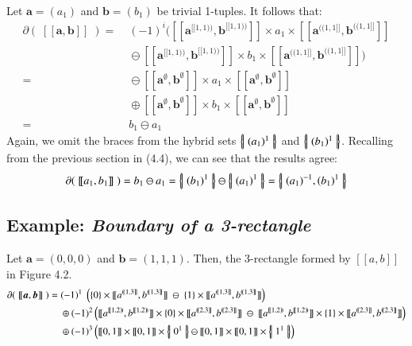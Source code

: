 Let $\boldsymbol{a}= (a_1)$ and $\boldsymbol{b} = (b_1)$ be trivial 1-tuples. 
It follows that:
\begin{align*}
	\partial ( \; [\![ \boldsymbol{a}, \boldsymbol{b} ]\!] \; )
	=& \; (-1)^i ( [\![\boldsymbol{a}^{[\![1,1)\!)}, \boldsymbol{b}^{[\![1,1)\!)} ]\!]
	\times a_1 \times
	[\![\boldsymbol{a}^{(\!(1,1]\!]}, \boldsymbol{b}^{(\!(1,1]\!]} ]\!]\\
	&\; \ominus
	[\![\boldsymbol{a}^{[\![1,1)\!)}, \boldsymbol{b}^{[\![1,1)\!)} ]\!]
	\times b_1 \times
	[\![\boldsymbol{a}^{(\!(1,1]\!]}, \boldsymbol{b}^{(\!(1,1]\!]} ]\!] )\\
	=& \; \ominus [\![\boldsymbol{a}^{\emptyset}, \boldsymbol{b}^{\emptyset} ]\!]
	\times a_1 \times
	[\![\boldsymbol{a}^{\emptyset}, \boldsymbol{b}^{\emptyset} ]\!]\\
	& \; \oplus
	[\![\boldsymbol{a}^{\emptyset}, \boldsymbol{b}^{\emptyset} ]\!]
	\times b_1 \times
	[\![\boldsymbol{a}^{\emptyset}, \boldsymbol{b}^{\emptyset} ]\!] \\
	=& \; b_1 \ominus a_1
\end{align*}
Again, we omit the braces from the hybrid sets $\left\{ \! \left| \; (a_1)^1 \; \right| \! \right\}$ and $\left\{ \! \left| \; (b_1)^1 \; \right| \! \right\}$.
Recalling from the previous section in (4.4), we can see that the results agree:
\begin{equation}
	\partial ( \; [\![ a_1 ,b_1 ]\!] \; ) = b_1 \ominus a_1 = \hset{(b_1)^1} \ominus \hset{(a_1)^1} = \hset{(a_1)^{-1}, (b_1)^1}
\end{equation}

\subsection{Example: \emph{Boundary of a 3-rectangle}}
Let $\boldsymbol{a} = (0,0,0)$ and $\boldsymbol{b} = (1,1,1)$.
Then, the 3-rectangle formed by $[\![a,b]\!]$ in Figure 4.2.
\begin{align*}
	\partial ( \; [\![ \boldsymbol{a} , \boldsymbol{b} ]\!] \; )
	=& \; (-1)^1  \; \left( \{ 0 \} \times [\![a^{(\!(1,3]\!]},b^{(\!(1,3]\!]}]\!] \; \ominus \; \{ 1 \} \times [\![a^{(\!(1,3]\!]},b^{(\!(1,3]\!]}]\!] \right)\\
	  & \; \oplus (-1)^2 \left( [\![a^{[\![1,2)\!)}, b^{[\![1,2)\!)} ]\!] \times \{ 0 \} \times [\![a^{(\!(2,3]\!]},b^{(\!(2,3]\!]}]\!] \; \ominus \; [\![a^{[\![1,2)\!)}, b^{[\![1,2)\!)} ]\!] \times \{ 1 \} \times [\![a^{(\!(2,3]\!]},b^{(\!(2,3]\!]}]\!] \right)\\
	  & \; \oplus (-1)^3 \left( [\![0,1]\!] \times [\![0,1]\!] \times \hset{0^1} \ominus [\![0,1]\!] \times [\![0,1]\!] \times \hset{1^1} \right)
\end{align*}

